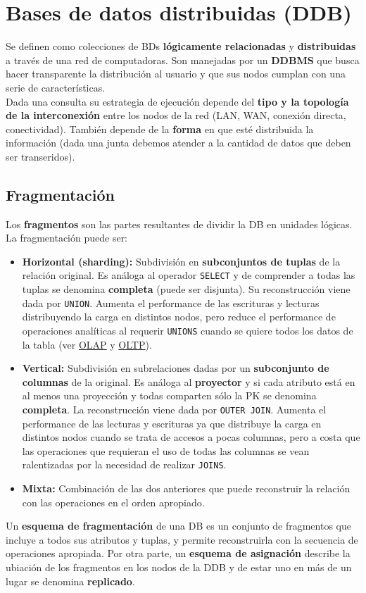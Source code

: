 \section*{Bases de datos distribuidas (DDB)}
Se definen como colecciones de BDs \textbf{lógicamente relacionadas} y \textbf{distribuidas} a través de una red de computadoras. Son manejadas por un \textbf{DDBMS} que busca hacer transparente la distribución al usuario y que sus nodos cumplan con una serie de características. \\
Dada una consulta su estrategia de ejecución depende del \textbf{tipo y la topología de la interconexión} entre los nodos de la red (LAN, WAN, conexión directa, conectividad). También depende de la \textbf{forma} en que esté distribuida la información (dada una junta debemos atender a la cantidad de datos que deben ser transeridos).



\subsection*{Fragmentación}
Los \textbf{fragmentos} son las partes resultantes de dividir la DB en unidades lógicas. La fragmentación puede ser:
\begin{itemize}
    \item \textbf{Horizontal (sharding):} Subdivisión en \textbf{subconjuntos de tuplas} de la relación original. Es análoga al operador \texttt{SELECT} y de comprender a todas las tuplas se denomina \textbf{completa} (puede ser disjunta). Su reconstrucción viene dada por \texttt{UNION}. Aumenta el performance de las escrituras y lecturas distribuyendo la carga en distintos nodos, pero reduce el performance de operaciones analíticas al requerir \texttt{UNIONS} cuando se quiere todos los datos de la tabla (ver \hyperlink{olap}{OLAP} y \hyperlink{oltp}{OLTP}).
    \item \textbf{Vertical:} Subdivisión en subrelaciones dadas por un \textbf{subconjunto de columnas} de la original. Es análoga al \textbf{proyector} y si cada atributo está en al menos una proyección y todas comparten sólo la PK se denomina \textbf{completa}. La reconstrucción viene dada por \texttt{OUTER JOIN}. Aumenta el performance de las lecturas y escrituras ya que distribuye la carga en distintos nodos cuando se trata de accesos a pocas columnas, pero a costa que las operaciones que requieran el uso de todas las columnas se vean ralentizadas por la necesidad de realizar \texttt{JOINS}.
    \item \textbf{Mixta:} Combinación de las dos anteriores que puede reconstruir la relación con las operaciones en el orden apropiado.
\end{itemize}
Un \textbf{esquema de fragmentación} de una DB es un conjunto de fragmentos que incluye a todos sus atributos y tuplas, y permite reconstruirla con la secuencia de operaciones apropiada. Por otra parte, un \textbf{esquema de asignación} describe la ubiación de los fragmentos en los nodos de la DDB y de estar uno en más de un lugar se denomina \textbf{replicado}.

